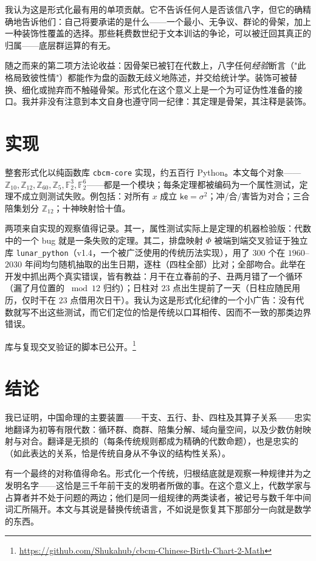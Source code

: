 \documentclass[11pt,a4paper,fontset=none]{ctexart}
\theoremstyle{definition}
\theoremstyle{remark}
\newcommand{\Z}{\mathbb{Z}}
\newcommand{\F}{\mathbb{F}}
\newcommand{\ke}{\mathsf{ke}}
\begin{document}
我认为这是形式化最有用的单项贡献。它不告诉任何人是否该信八字，但它的确精确地告诉他们：自己将要承诺的是什么——一个最小、无争议、群论的骨架，加上一种装饰性覆盖的选择。那些耗费数世纪于文本训诂的争论，可以被迁回其真正的归属——底层群运算的有无。

随之而来的第二项方法论收益：因骨架已被钉在代数上，八字任何\emph{经验}断言（"此格局致彼性情"）都能作为盘的函数无歧义地陈述，并交给统计学。装饰可被替换、细化或抛弃而不触碰骨架。形式化在这个意义上是一个为可证伪性准备的接口。我并非没有注意到本文自身也遵守同一纪律：其定理是骨架，其注释是装饰。

\section{实现}\label{sec:impl}
整套形式化以纯函数库 \texttt{cbcm-core} 实现，约五百行 Python。本文每个对象——$\Z_{10},\Z_{12},\Z_{60},\Z_5,\F_2^3,\F_2^6$——都是一个模块；每条定理都被编码为一个属性测试，定理不成立则测试失败。例包括：对所有 $x$ 成立 $\ke=\sigma^2$；冲/合/害皆为对合；三合陪集划分 $\Z_{12}$；十神映射恰十值。

两项来自实现的观察值得记录。其一，属性测试实际上是定理的机器检验版：代数中的一个 bug 就是一条失败的定理。其二，排盘映射 $\Phi$ 被端到端交叉验证于独立库 \texttt{lunar\_python}（v1.4，一个被广泛使用的传统历法实现），用了 $300$ 个在 $1960$--$2030$ 年间均匀随机抽取的出生日期，逐柱（四柱全部）比对；全部吻合。此举在开发中抓出两个真实错误，皆有教益：月干在立春前的子、丑两月错了一个循环（漏了月位置的 $\bmod 12$ 归约）；日柱对 $23$ 点出生提前了一天（日柱应随民用历，仅时干在 $23$ 点借用次日干）。我认为这是形式化纪律的一个小广告：没有代数就写不出这些测试，而它们定位的恰是传统以口耳相传、因而不一致的那类边界错误。

库与复现交叉验证的脚本已公开。\footnote{\url{https://github.com/Shukahub/cbcm-Chinese-Birth-Chart-2-Math}}

\section{结论}\label{sec:conclusion}
我已证明，中国命理的主要装置——干支、五行、卦、四柱及其算子关系——忠实地翻译为初等有限代数：循环群、商群、陪集分解、域向量空间，以及少数仿射映射与对合。翻译是无损的（每条传统规则都成为精确的代数命题），也是忠实的（如此表达的关系，恰是传统自身从不争议的结构性关系）。

有一个最终的对称值得命名。形式化一个传统，归根结底就是观察一种规律并为之发明名字——这恰是三千年前干支的发明者所做的事。在这个意义上，代数学家与占算者并不处于问题的两边；他们是同一组规律的两类读者，被记号与数千年中间词汇所隔开。本文与其说是替换传统语言，不如说是恢复其下那部分一向就是数学的东西。
\end{document}
